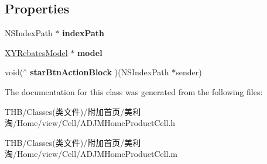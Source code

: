 \subsection*{Properties}
\begin{DoxyCompactItemize}
\item 
\mbox{\label{interface_a_d_j_m_home_product_cell_aac87fcbfd292772297e3d37193d602ad}} 
N\+S\+Index\+Path $\ast$ {\bfseries index\+Path}
\item 
\mbox{\label{interface_a_d_j_m_home_product_cell_a7fa10c43bbdc0dde6e55ebe78342eb1a}} 
\mbox{\hyperlink{interface_x_y_rebates_model}{X\+Y\+Rebates\+Model}} $\ast$ {\bfseries model}
\item 
\mbox{\label{interface_a_d_j_m_home_product_cell_abc6f7693271df85a08dbd24fe3a6bf9e}} 
void($^\wedge$ {\bfseries star\+Btn\+Action\+Block} )(N\+S\+Index\+Path $\ast$sender)
\end{DoxyCompactItemize}


The documentation for this class was generated from the following files\+:\begin{DoxyCompactItemize}
\item 
T\+H\+B/\+Classes(类文件)/附加首页/美利淘/\+Home/view/\+Cell/A\+D\+J\+M\+Home\+Product\+Cell.\+h\item 
T\+H\+B/\+Classes(类文件)/附加首页/美利淘/\+Home/view/\+Cell/A\+D\+J\+M\+Home\+Product\+Cell.\+m\end{DoxyCompactItemize}
